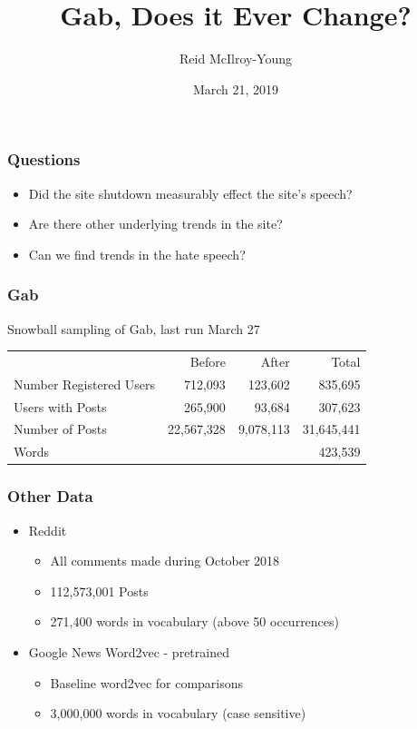 \documentclass{beamer}
\author[]{Reid McIlroy-Young}
\date{March 21, 2019}
\title{Gab, Does it Ever Change?}
\begin{document}
\begin{frame}
\titlepage
\end{frame}

\begin{frame}
\frametitle{Questions}
	\begin{itemize}
	\item Did the site shutdown measurably effect the site's speech?
	\item Are there other underlying trends in the site?
	\item Can we find trends in the hate speech?
\end{itemize}
\end{frame}	

\begin{frame}
\frametitle{Gab}

Snowball sampling of Gab, last run March 27
\begin{table}[h]
	\centering
	\begin{tabular}{lrrr}
		\toprule
		&Before&After&Total\\
		Number Registered Users &712,093&123,602&835,695\\
		Users with Posts& 265,900& 93,684&307,623\\
		Number of Posts& 22,567,328& 9,078,113&31,645,441\\
		Words &&&423,539\\
		\bottomrule
	\end{tabular}
\end{table}
\end{frame}

\begin{frame}
\frametitle{Other Data}

\begin{itemize}
\item Reddit 
\begin{itemize}
	\item All comments made during October 2018
	\item 112,573,001 Posts 
	\item 271,400 words in vocabulary (above 50 occurrences)
\end{itemize}
\item  Google News Word2vec - pretrained
\begin{itemize}
	\item Baseline word2vec for comparisons
	\item 3,000,000 words in vocabulary (case sensitive)
\end{itemize}
\end{itemize}
\end{frame}
\end{document}
